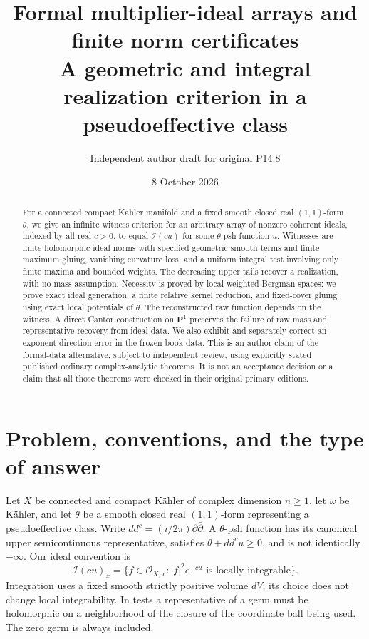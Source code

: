 \documentclass[11pt]{article}
\title{Formal multiplier-ideal arrays and finite norm certificates\\
\large A geometric and integral realization criterion in a pseudoeffective class}
\author{Independent author draft for original P14.8}
\date{8 October 2026}
\newcommand{\I}{\mathcal I}
\newcommand{\OO}{\mathcal O}
\theoremstyle{definition}
\begin{document}
\maketitle
\begin{abstract}
For a connected compact K\"ahler manifold and a fixed smooth closed
real $(1,1)$-form $\theta$, we give an infinite witness criterion for
an arbitrary array of nonzero coherent ideals, indexed by all real
$c>0$, to equal $\I(cu)$ for some $\theta$-psh function $u$.
Witnesses are finite holomorphic ideal norms with specified geometric
smooth terms and finite maximum gluing, vanishing curvature loss,
and a uniform integral test involving only finite maxima and bounded
weights. The decreasing upper tails recover a realization, with no
mass assumption. Necessity is proved by local weighted Bergman spaces:
we prove exact ideal generation, a finite relative kernel reduction,
and fixed-cover gluing using exact local potentials of $\theta$.
The reconstructed raw function depends on the witness. A direct
Cantor construction on $\mathbf P^1$ preserves the failure of raw
mass and representative recovery from ideal data. We also exhibit
and separately correct an exponent-direction error in the frozen
book data. This is an author claim of the formal-data alternative,
subject to independent review, using explicitly stated published
ordinary complex-analytic theorems. It is not an acceptance decision
or a claim that all those theorems were checked in their original
primary editions.
\end{abstract}
\tableofcontents

\section{Problem, conventions, and the type of answer}
Let $X$ be connected and compact K\"ahler of complex dimension $n\geq1$,
let $\omega$ be K\"ahler, and let $\theta$ be a smooth closed real
$(1,1)$-form representing a pseudoeffective class. Write
$dd^c=(i/2\pi)\partial\bar\partial$. A $\theta$-psh function has its
canonical upper semicontinuous representative, satisfies
$\theta+dd^cu\geq0$, and is not identically $-\infty$.
Our ideal convention is
\begin{equation}\label{eq:ideal}
 \I(cu)_x=\{f\in\OO_{X,x}: |f|^2e^{-cu}\text{ is locally integrable}\}.
\end{equation}
Integration uses a fixed smooth strictly positive volume $dV$; its
choice does not change local integrability. In tests a representative
of a germ must be holomorphic on a neighborhood of the closure of the
coordinate ball being used. The zero germ is always included.
\end{document}
